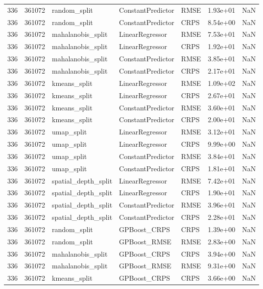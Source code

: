 \begin{tabular}{rrlllrr}
336 & 361072 & random\_split & ConstantPredictor & RMSE & 1.93e+01 & NaN \\
336 & 361072 & random\_split & ConstantPredictor & CRPS & 8.54e+00 & NaN \\
336 & 361072 & mahalanobis\_split & LinearRegressor & RMSE & 7.53e+01 & NaN \\
336 & 361072 & mahalanobis\_split & LinearRegressor & CRPS & 1.92e+01 & NaN \\
336 & 361072 & mahalanobis\_split & ConstantPredictor & RMSE & 3.85e+01 & NaN \\
336 & 361072 & mahalanobis\_split & ConstantPredictor & CRPS & 2.17e+01 & NaN \\
336 & 361072 & kmeans\_split & LinearRegressor & RMSE & 1.09e+02 & NaN \\
336 & 361072 & kmeans\_split & LinearRegressor & CRPS & 2.67e+01 & NaN \\
336 & 361072 & kmeans\_split & ConstantPredictor & RMSE & 3.60e+01 & NaN \\
336 & 361072 & kmeans\_split & ConstantPredictor & CRPS & 2.00e+01 & NaN \\
336 & 361072 & umap\_split & LinearRegressor & RMSE & 3.12e+01 & NaN \\
336 & 361072 & umap\_split & LinearRegressor & CRPS & 9.99e+00 & NaN \\
336 & 361072 & umap\_split & ConstantPredictor & RMSE & 3.84e+01 & NaN \\
336 & 361072 & umap\_split & ConstantPredictor & CRPS & 1.81e+01 & NaN \\
336 & 361072 & spatial\_depth\_split & LinearRegressor & RMSE & 7.42e+01 & NaN \\
336 & 361072 & spatial\_depth\_split & LinearRegressor & CRPS & 1.90e+01 & NaN \\
336 & 361072 & spatial\_depth\_split & ConstantPredictor & RMSE & 3.96e+01 & NaN \\
336 & 361072 & spatial\_depth\_split & ConstantPredictor & CRPS & 2.28e+01 & NaN \\
336 & 361072 & random\_split & GPBoost\_CRPS & CRPS & 1.39e+00 & NaN \\
336 & 361072 & random\_split & GPBoost\_RMSE & RMSE & 2.83e+00 & NaN \\
336 & 361072 & mahalanobis\_split & GPBoost\_CRPS & CRPS & 3.94e+00 & NaN \\
336 & 361072 & mahalanobis\_split & GPBoost\_RMSE & RMSE & 9.31e+00 & NaN \\
336 & 361072 & kmeans\_split & GPBoost\_CRPS & CRPS & 3.66e+00 & NaN \\

\end{tabular}
